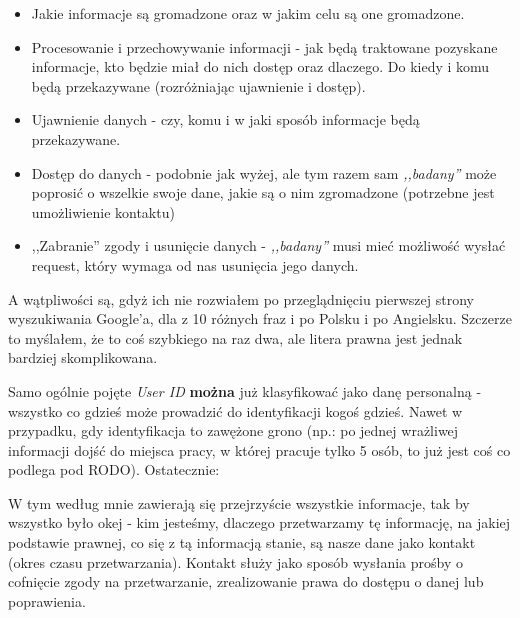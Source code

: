 \documentclass[graybox]{svmult}
\begin{document}
\begin{itemize}
  \item Jakie informacje są gromadzone oraz w jakim celu są one gromadzone.
  \item Procesowanie i przechowywanie informacji - jak będą traktowane pozyskane informacje, kto będzie miał do nich dostęp oraz dlaczego. Do kiedy i komu będą przekazywane (rozróżniając ujawnienie i dostęp).
  \item Ujawnienie danych - czy, komu i w jaki sposób informacje będą przekazywane. 
  \item Dostęp do danych - podobnie jak wyżej, ale tym razem sam \emph{,,badany''} może poprosić o wszelkie swoje dane, jakie są o nim zgromadzone (potrzebne jest umożliwienie kontaktu)
  \item ,,Zabranie'' zgody i usunięcie danych - \emph{,,badany''} musi mieć możliwość wysłać request, który wymaga od nas usunięcia jego danych.
\end{itemize}

A wątpliwości są, gdyż ich nie rozwiałem po przeglądnięciu pierwszej strony wyszukiwania Google'a, dla z 10 różnych fraz i po Polsku i po Angielsku. Szczerze to myślałem, że to coś szybkiego na raz dwa, ale litera prawna jest jednak bardziej skomplikowana. 

Samo ogólnie pojęte \emph{User ID} \textbf{można} już klasyfikować jako danę personalną - wszystko co gdzieś może prowadzić do identyfikacji kogoś gdzieś. Nawet w przypadku, gdy identyfikacja to zawężone grono (np.: po jednej wrażliwej informacji dojść do miejsca pracy, w której pracuje tylko 5 osób, to już jest coś co podlega pod RODO). Ostatecznie:


W tym według mnie zawierają się przejrzyście wszystkie informacje, tak by wszystko było okej - kim jesteśmy, dlaczego przetwarzamy tę informację, na jakiej podstawie prawnej, co się z tą informacją stanie, są nasze dane jako kontakt (okres czasu przetwarzania). Kontakt służy jako sposób wysłania prośby o cofnięcie zgody na przetwarzanie, zrealizowanie prawa do dostępu o danej lub poprawienia. 
\end{document}
